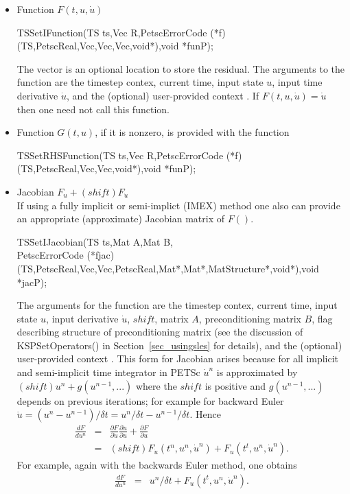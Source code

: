 \begin{itemize}
\item Function $F(t,u,\dot{u})$
  \begin{tabbing}
    TSSetIFunction(TS ts,Vec R,PetscErrorCode (*f)(TS,PetscReal,Vec,Vec,Vec,void*),void *funP);
  \end{tabbing}
  The vector  is an optional location to store the residual.
  The arguments to the function  are the
  timestep contex, current time, input state $u$, input time derivative
  $\dot{u}$, and the (optional) user-provided context . If    $F(t,u,\dot{u}) = \dot{u} $ then
  one need not call this function.

\item Function $ G(t,u)$, if it is nonzero, is provided with the function
  \begin{tabbing}
    TSSetRHSFunction(TS ts,Vec R,PetscErrorCode (*f)(TS,PetscReal,Vec,Vec,void*),void *funP);
  \end{tabbing}

\item Jacobian $F_u + (shift)F_{\dot{u}}$ \\
  If using a fully implicit or semi-implict (IMEX) method one also can provide an appropriate (approximate) Jacobian matrix of $F()$.
  \begin{tabbing}
    TS\=SetIJacobian(TS ts,Mat A,Mat B,\\
    \>PetscErrorCode (*fjac)(TS,PetscReal,Vec,Vec,PetscReal,Mat*,Mat*,MatStructure*,void*),void *jacP);
  \end{tabbing}
  The arguments for the function 
  are the timestep contex, current time, input state $u$, input
  derivative $\dot{u}$, $shift$, matrix $A$, preconditioning matrix
  $B$, flag describing structure of preconditioning matrix (see the
  discussion of KSPSetOperators() in Section~\ref{sec_usingsles} for
  details), and the (optional) user-provided context .
  This form for Jacobian arises because for all implicit and semi-implicit time integrator in PETSc $\dot{u}^n$ is approximated by $(shift) u^n + g(u^{n-1},...)$
  where the $shift$ is positive and $ g(u^{n-1},...)$ depends on previous iterations;
  for example for backward Euler $\dot{u} = (u^n - u^{n-1})/\delta t = u^n/\delta t - u^{n-1}/\delta t.$  Hence
\begin{eqnarray*}
    \frac{d F}{d u^n} &  = &  \frac{\partial F}{\partial \dot{u}}\frac{\partial \dot{u}}{\partial u} + \frac{\partial F}{\partial u}\\
                      & = &   (shift) F_{\dot{u}}(t^n,u^n,\dot{u}^n) + F_u(t^t,u^n,\dot{u}^n).
\end{eqnarray*}
  For example, again with the backwards Euler method, one obtains
\begin{eqnarray*}
    \frac{d F}{d u^n} & = &   u^n/\delta t + F_u(t^t,u^n,\dot{u}^n).
\end{eqnarray*}


\end{itemize}
